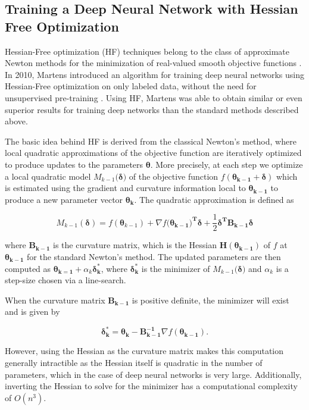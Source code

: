 \documentclass{article}
\begin{document}
\subsection{Training a Deep Neural Network with Hessian Free Optimization}

Hessian-Free optimization (HF) techniques belong to the class of approximate
Newton methods for the minimization of real-valued smooth objective functions
\cite{martens2012training}. In 2010, Martens introduced an algorithm for
training deep neural networks using Hessian-Free optimization on only labeled
data, without the need for unsupervised pre-training \cite{martens2010deep}.
Using HF, Martens was able to obtain similar or even superior results for
training deep networks than the standard methods described above. 

The basic idea behind HF is derived from the classical Newton's method, where
local quadratic approximations of the objective function are iteratively
optimized to produce updates to the parameters $\mathbf{\theta}$.  More
precisely, at each step we optimize a local quadratic model
$M_{k-1}(\mathbf{\delta)}$ of the objective function $f(\mathbf{\theta_{k-1}} +
\mathbf{\delta})$ which is estimated using the gradient and curvature
information local to $\mathbf{\theta_{k-1}}$ to produce a new parameter vector
$\mathbf{\theta_k}$. The quadratic approximation is defined as

\[
  M_{k-1}(\mathbf{\delta}) = f(\mathbf{\theta}_{k-1})
  + \nabla f(\mathbf{\theta_{k-1})^T \delta}
  + \frac{1}{2} \mathbf{\delta^T B_{k-1} \delta}
\]

where $\mathbf{B_{k-1}}$ is the curvature matrix, which is the Hessian
$\mathbf{H(\theta_{k-1})}$ of $f$ at $\mathbf{\theta_{k-1}}$ for the standard
Newton's method. The updated parameters are then computed as
$\mathbf{\theta_{k=1}} + \alpha_k \mathbf{\delta^{*}_{k}}$, where
$\mathbf{\delta^{*}_{k}}$ is the minimizer of $M_{k-1}(\mathbf{\delta)}$ and
$\alpha_k$ is a step-size chosen via a line-search.

When the curvature matrix $\mathbf{B_{k-1}}$ is positive definite, the minimizer will
exist and is given by

\[
  \mathbf{\delta^{*}_{k}} =
  \mathbf{\theta_k} - \mathbf{B^{-1}_{k-1}} \nabla f(\mathbf{\theta_{k-1}}).
\]

However, using the Hessian as the curvature matrix makes this computation
generally intractible as the Hessian itself is quadratic in the number
of parameters, which in the case of deep neural networks is very large.
Additionally, inverting the Hessian to solve for the minimizer has a computational
complexity of $O(n^3)$.
\end{document}
